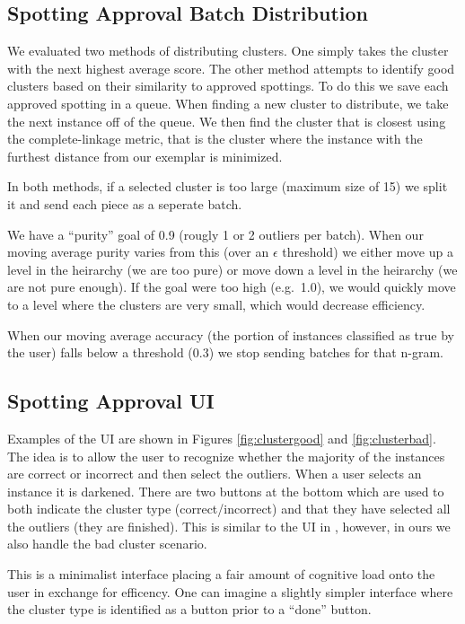 \documentclass[ms,electronic,twosidetoc,letterpaper,chaptercenter,parttop,lof,lot]{byumsphd}
\begin{document}
\subsection{Spotting Approval Batch Distribution}

We evaluated two methods of distributing clusters.
One simply takes the cluster with the next highest average score.
The other method attempts to identify good clusters based on their similarity to approved spottings. To do this we save each approved spotting in a queue. When finding a new cluster to distribute, we take the next instance off of the queue. We then find the cluster that is closest using the complete-linkage metric, that is the cluster where the instance with the furthest distance from our exemplar is minimized.

In both methods, if a selected cluster is too large (maximum size of 15) we split it and send each piece as a seperate batch.

We have a ``purity'' goal of 0.9 (rougly 1 or 2 outliers per batch). When our moving average purity varies from this (over an $\epsilon$ threshold) we either move up a level in the heirarchy (we are too pure) or move down a level in the heirarchy (we are not pure enough). If the goal were too high (e.g.~1.0), we would quickly move to a level where the clusters are very small, which would decrease efficiency.

When our moving average accuracy (the portion of instances classified as true by the user) falls below a threshold (0.3) we stop sending batches for that n-gram.

\subsection{Spotting Approval UI}

Examples of the UI are shown in Figures \ref{fig:clustergood} and \ref{fig:clusterbad}. The idea is to allow the user to recognize whether the majority of the instances are correct or incorrect and then select the outliers. When a user selects an instance it is darkened. There are two buttons at the bottom which are used to both indicate the cluster type (correct/incorrect) and that they have selected all the outliers (they are finished). This is similar to the UI in \cite{Clawson2014}, however, in ours we also handle the bad cluster scenario.

This is a minimalist interface placing a fair amount of cognitive load onto the user in exchange for efficency. One can imagine a slightly simpler interface where the cluster type is identified as a button prior to a ``done'' button.
\end{document}
